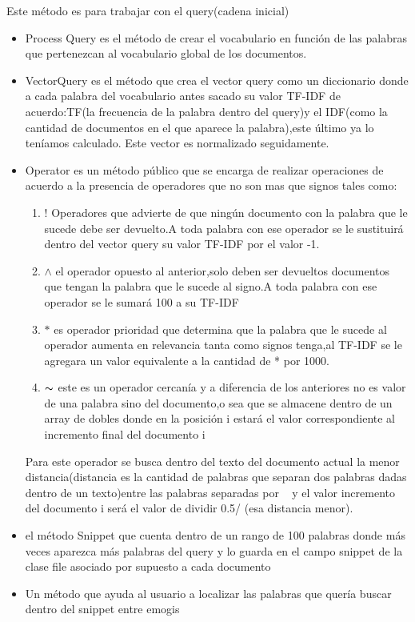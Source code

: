 \documentclass[a4paper,12pt]{article}
\begin{document}
Este método es para trabajar con el query(cadena inicial)
\begin{itemize}
    \item Process Query es el método de crear el vocabulario en función de las palabras
    que pertenezcan al vocabulario global de los documentos.
    \item VectorQuery es el método que crea el vector query como un diccionario donde
    a cada palabra del vocabulario  antes sacado su valor TF-IDF de acuerdo:TF(la
    frecuencia de la palabra dentro del query)y el IDF(como la cantidad de
    documentos en el que aparece la palabra),este \'ultimo  ya lo teníamos calculado.
    Este vector es normalizado seguidamente.
    \item Operator es un método p\'ublico que se encarga de realizar operaciones de
    acuerdo a la presencia de operadores que no son mas que signos tales como:
    \begin{enumerate}
        \item ! Operadores que  advierte de  que ningún documento con la palabra que le sucede
        debe ser devuelto.A toda palabra con ese operador se le sustituirá dentro del
        vector query su valor TF-IDF por el valor -1.
        \item $\wedge$ el operador opuesto al anterior,solo deben ser devueltos documentos que
        tengan la palabra que le sucede al signo.A toda palabra con ese operador se le
        sumar\'a 100 a su TF-IDF
        \item  $\ast$  es operador prioridad que determina que la palabra que le sucede al operador
        aumenta en relevancia tanta como signos tenga,al TF-IDF se le agregara un
        valor equivalente a la cantidad de * por 1000.
        \item $\thicksim$ este es un operador cercanía y a diferencia de  los anteriores no es valor de
        una palabra sino del documento,o sea que se almacene dentro de un array de
        dobles donde en la posición i estará el valor correspondiente al incremento final
        del documento i
        
    \end{enumerate}
    Para este operador se  busca dentro del texto del documento actual la menor
    distancia(distancia es la cantidad de palabras que separan dos palabras dadas
    dentro de un texto)entre las palabras separadas por ~ y  el valor incremento del
    documento i será el valor de dividir 0.5/ (esa distancia menor).
    
    \item el  método  Snippet que cuenta dentro de un rango de 100 palabras donde más
    veces aparezca  más palabras del query  y lo guarda en el campo snippet de la
    clase file asociado por supuesto a cada documento 
    \item Un método que ayuda al usuario a localizar las palabras que  quería buscar
    dentro del snippet entre emogis 
\end{itemize}
\end{document}
